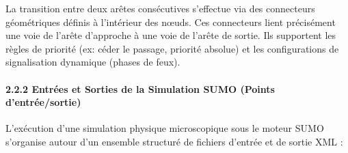 \documentclass[10pt, a4paper]{article}
\begin{document}
La transition entre deux arêtes consécutives s'effectue via des
connecteurs géométriques définis à l'intérieur des nœuds. Ces
connecteurs lient précisément une voie de l'arête d'approche à une voie
de l'arête de sortie. Ils supportent les règles de priorité (ex: céder
le passage, priorité absolue) et les configurations de signalisation
dynamique (phases de feux).

\paragraph{2.2.2 Entrées et Sorties de la Simulation SUMO (Points
d'entrée/sortie)}\label{entruxe9es-et-sorties-de-la-simulation-sumo-points-dentruxe9esortie}

L'exécution d'une simulation physique microscopique sous le moteur SUMO
s'organise autour d'un ensemble structuré de fichiers d'entrée et de
sortie XML :
\end{document}

